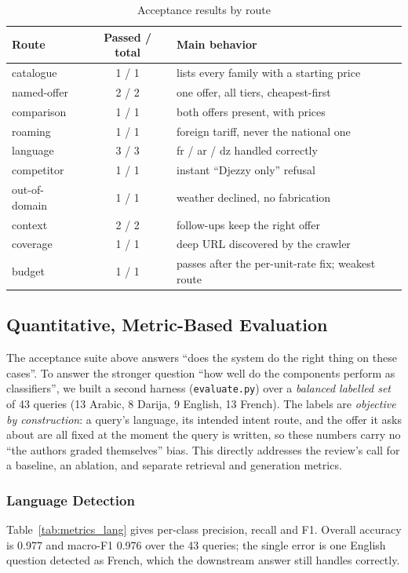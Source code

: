 \documentclass[12pt, a4paper]{report}
\newcommand{\humantext}[1]{#1}      %
\begin{document}
\begin{table}[H]
\centering
\caption{Acceptance results by route}
\label{tab:pass_route}
\begin{tabularx}{\textwidth}{l c X}
\toprule
\textbf{Route} & \textbf{Passed / total} & \textbf{Main behavior} \\
\midrule
catalogue     & 1 / 1 & lists every family with a starting price \\
named-offer   & 2 / 2 & one offer, all tiers, cheapest-first \\
comparison    & 1 / 1 & both offers present, with prices \\
roaming       & 1 / 1 & foreign tariff, never the national one \\
language      & 3 / 3 & fr / ar / dz handled correctly \\
competitor    & 1 / 1 & instant ``Djezzy only'' refusal \\
out-of-domain & 1 / 1 & weather declined, no fabrication \\
context       & 2 / 2 & follow-ups keep the right offer \\
coverage      & 1 / 1 & deep URL discovered by the crawler \\
budget        & 1 / 1 & passes after the per-unit-rate fix; weakest route \\
\bottomrule
\end{tabularx}
\end{table}

\subsection{Quantitative, Metric-Based Evaluation}
\label{sec:metrics}
\humantext{The acceptance suite above answers ``does the system do the right thing on these cases''. To answer the stronger question ``how well do the components perform as classifiers'', we built a second harness (\texttt{evaluate.py}) over a \emph{balanced labelled set} of 43 queries (13 Arabic, 8 Darija, 9 English, 13 French). The labels are \emph{objective by construction}: a query's language, its intended intent route, and the offer it asks about are all fixed at the moment the query is written, so these numbers carry no ``the authors graded themselves'' bias. This directly addresses the review's call for a baseline, an ablation, and separate retrieval and generation metrics.}

\subsubsection{Language Detection}
\humantext{Table~\ref{tab:metrics_lang} gives per-class precision, recall and F1. Overall accuracy is 0.977 and macro-F1 0.976 over the 43 queries; the single error is one English question detected as French, which the downstream answer still handles correctly.}
\end{document}
